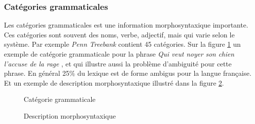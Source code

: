 \subsubsection{Catégories grammaticales}
Les catégories grammaticales est une information morphosyntaxique importante. Ces catégories sont souvent des noms, verbe, adjectif, mais qui varie selon le système. Par exemple \textit{Penn Treebank} contient 45 catégories. Sur la figure \ref{categorie-grammaticale} un exemple de catégorie grammaticale pour la phrase \textit{\og Qui veut noyer son chien l’accuse de la rage \fg{}}, et qui illustre aussi la problème d'ambiguité pour cette phrase. En général 25\% du lexique est de forme ambigus pour la langue française. Et un exemple de description morphosyntaxique illustré dans la figure \ref{exemple-desc-morphosyntaxique}.

\begin{figure}[htbp]
    \begin{center}
        \caption{Catégorie grammaticale \citep{handbook-nlp}}
    \end{center}
    \label{categorie-grammaticale}
\end{figure}

\begin{figure}[htbp]
    \begin{center}
        \caption{Description morphosyntaxique \citep{handbook-nlp}}
    \end{center}
    \label{exemple-desc-morphosyntaxique}
\end{figure}

